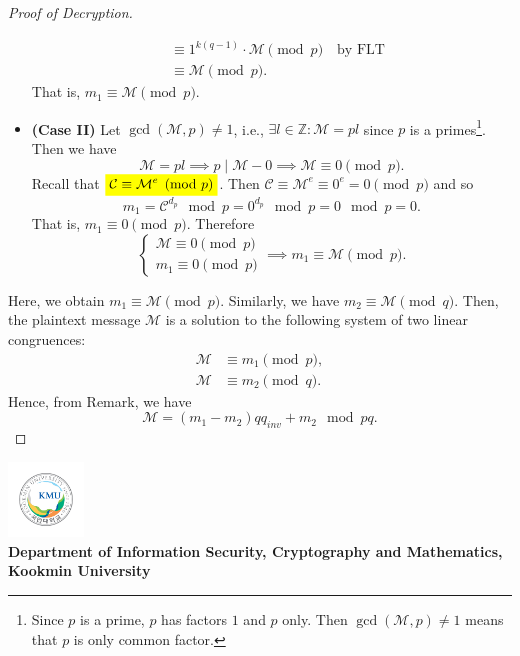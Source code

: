 \documentclass{article}
\newcommand{\mathcolorbox}[2]{\colorbox{#1}{$\displaystyle #2$}}
\newcommand{\footer}[1]{
	\begin{flushright}
		\vspace{2em}
		\includegraphics[width=2cm]{school_logo.jpg} \\
		\vspace{1em}
		\textcolor{blue2}{\small\textbf{#1}}
	\end{flushright}
}
\newcommand{\ie}{\textnormal{i.e.}}
\theoremstyle{definition}
\newcommand{\Z}{\mathbb{Z}}
\newcommand{\of}[1]{\left( #1 \right)}
\begin{document}
\begin{proof}[Proof of Decryption]
\begin{itemize}
\begin{tcolorbox}[colback=white,colframe=black,arc=5pt,title={\color{white}\bf }]
\begin{align*}
				&\equiv 1^{k(q-1)}\cdot\mathcal{M}\pmod{p}\quad\text{by FLT}\\
				&\equiv\mathcal{M}\pmod{p}.
				\end{align*} That is, $m_1\equiv\mathcal{M}\pmod{p}$.
			\end{tcolorbox}
			\item[] \begin{tcolorbox}[colback=white,colframe=black,arc=5pt,title={\color{white}\bf }]
				\textbf{(Case II)} Let $\gcd\of{\mathcal{M},p}\neq 1$, \ie, $\exists l\in\Z:\mathcal{M}=pl$ since $p$ is a primes\footnote{Since $p$ is a prime, $p$ has factors $1$ and $p$ only. Then $\gcd\of{\mathcal{M},p}\neq 1$ means that $p$ is only common factor.}. Then we have \[
				\mathcal{M}=pl\implies p\mid\mathcal{M}-0\implies\mathcal{M}\equiv 0\pmod{p}.
				\] Recall that $\mathcolorbox{-blue}{\mathcal{C}\equiv\mathcal{M}^e\pmod{p}}$. Then $\mathcal{C}\equiv\mathcal{M}^e\equiv 0^e=0\pmod{p}$ and so\[
				m_1=\mathcal{C}^{d_p}\mod p=0^{d_p}\mod p= 0\mod p=0.
				\] That is, $m_1\equiv 0\pmod{p}$. Therefore \[
				\begin{cases}
				\mathcal{M}\equiv 0\pmod{p}\\
				m_1\equiv 0\pmod{p}
				\end{cases}\implies m_1\equiv\mathcal{M}\pmod{p}.
				\] 
			\end{tcolorbox}
		\end{itemize} 
		Here, we obtain $m_1\equiv\mathcal{M}\pmod{p}$. Similarly, we have $m_2\equiv\mathcal{M}\pmod{q}$. Then, the plaintext message $\mathcal{M}$ is a solution to the following system of two linear congruences: \begin{align*}
		\mathcal{M}&\equiv m_1\pmod{p},\\
		\mathcal{M}&\equiv m_2\pmod{q}.
		\end{align*}
		Hence, from Remark, we have \[
		\mathcal{M}=(m_1-m_2)qq_{inv}+m_2\mod pq.
		\]
	\end{proof}
	
	\footer{Department of Information Security, Cryptography and Mathematics, Kookmin University}
\end{document}
